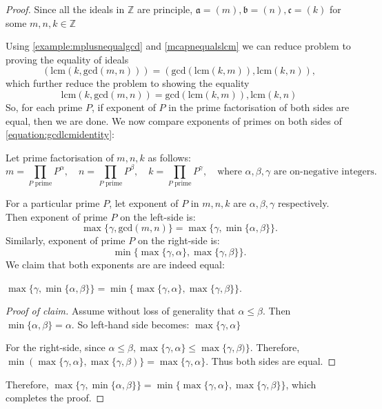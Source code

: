 \begin{proof}
    Since all the ideals in \(\mathbb{Z}\) are principle, \(\mathfrak{a}=(m), \mathfrak{b} = (n), \mathfrak{c} = (k)\) for some \(m,n,k \in \mathbb{Z}\)

    Using \autoref{example:mplusnequalgcd} and \autoref{mcapnequalslcm} we can reduce problem to proving the equality of ideals \[
        (\text{lcm}(k, \text{gcd}(m,n))) = (\text{gcd}(\text{lcm}(k, m)), \text{lcm}(k, n)),
    \] which further reduce the problem to showing the equality 
    \begin{equation}\label{equation:gcdlcmidentity}
        \text{lcm}(k, \text{gcd}(m,n)) = \text{gcd}(\text{lcm}(k, m)), \text{lcm}(k, n)
    \end{equation}
    So, for each prime \(P\), if exponent of \(P\) in the prime factorisation of both sides are equal, then we are done. We now compare exponents of primes on both sides of \autoref{equation:gcdlcmidentity}:

    Let prime factorisation of \(m,n,k\) as follows:
     \[
         m = \prod_{P \text{ prime}} P^\alpha, \quad n = \prod_{P \text{ prime}} P^\beta, \quad k = \prod_{P \text{ prime}} P^\gamma, \quad \text{where } \alpha, \beta, \gamma \text{ are on-negative integers}.
    \]
    
    For a particular prime \(P\), let exponent of  \(P\) in \(m,n,k\) are  \(\alpha, \beta, \gamma\) respectively. Then
    exponent of prime \(P\) on the left-side is:  \[\max\{\gamma, \text{gcd}(m,n)\} = \max\{\gamma, \min\{\alpha,\beta\}\}.\]
    Similarly, exponent of prime \(P\) on the right-side is:
     \[
         \min\{\max\{\gamma, \alpha\}, \max\{\gamma, \beta\}\}.
    \]
    We claim that both exponents are are indeed equal:
       \begin{claim}
           \(\max\{\gamma, \min\{\alpha,\beta\}\} = \min\{\max\{\gamma, \alpha\}, \max\{\gamma, \beta\}\}\).
       \end{claim}
       \begin{proof}[Proof of claim]
           Assume without loss of generality that \(\alpha \le \beta\).
           Then \(\min\{\alpha,\beta\}=\alpha\). So left-hand side becomes: \(\max\{\gamma,\alpha\}\)

           For the right-side, since \(\alpha \le \beta, \max\{\gamma,\alpha\} \le \max\{\gamma,\beta)\}.\)
       Therefore, \(\min(\max\{\gamma,\alpha\},\max\{\gamma,\beta)\} = \max\{\gamma,\alpha\}\). Thus both sides are equal.
       \end{proof}
       Therefore, \(\max\{\gamma, \min\{\alpha,\beta\}\} = \min\{\max\{\gamma, \alpha\}, \max\{\gamma, \beta\}\}\), which completes the proof.
\end{proof}
